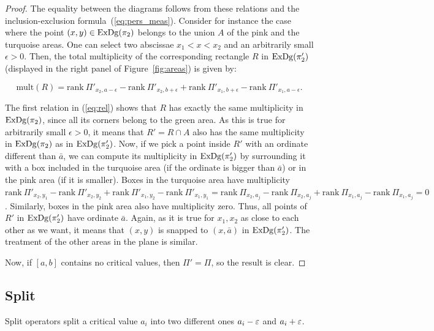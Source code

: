 \begin{proof}
The equality between the diagrams follows from these relations and the
inclusion-exclusion formula~(\ref{eq:pers_meas}).  Consider for
instance the case where the point $(x,y)\in\mathrm{ExDg}(\pi_2)$ belongs to the
union $A$ of the pink and the turquoise areas.  One can select two
abscissae $x_1<x<x_2$ and an arbitrarily small $\epsilon>0$. Then, the
total multiplicity of the corresponding rectangle $R$ in $\mathrm{ExDg}(\pi_2')$
(displayed in the right panel of Figure~\ref{fig:areas}) is given by:

\[ \text{mult}(R)=\text{rank}\ \Pi'_{x_2,a-\epsilon}-\text{rank}\ \Pi'_{x_2,b+\epsilon}+\text{rank}\ \Pi'_{x_1,b+\epsilon}-\text{rank}\ \Pi'_{x_1,a-\epsilon}. \]

The first relation in (\ref{eq:rel}) shows that $R$ has exactly the same multiplicity in $\mathrm{ExDg}(\pi_2)$, since all its corners belong to the green area.
As this is true for arbitrarily small $\epsilon>0$, it means that $R'=R\cap A$  also has the same multiplicity in $\mathrm{ExDg}(\pi_2)$ as in $\mathrm{ExDg}(\pi'_2)$.
Now, if we pick a point inside $R'$ with an ordinate different than $\bar{a}$, we can compute its multiplicity in $\mathrm{ExDg}(\pi'_2)$ 
by surrounding it with a box included in the turquoise area (if the ordinate is bigger than $\bar{a}$) or in the pink area (if it is smaller). 
Boxes in the turquoise area have multiplicity 
$\text{rank}\ \Pi'_{x_2,y_1}-\text{rank}\ \Pi'_{x_2,y_2}+\text{rank}\ \Pi'_{x_1,y_2}-\text{rank}\ \Pi'_{x_1,y_1}
=\text{rank}\ \Pi_{x_2,a_j}-\text{rank}\ \Pi_{x_2,a_j}+\text{rank}\ \Pi_{x_1,a_j}-\text{rank}\ \Pi_{x_1,a_j}=0$. 
Similarly, boxes in the pink area also have  multiplicity zero. Thus, all points of $R'$ in $\mathrm{ExDg}(\pi'_2)$ have 
ordinate $\bar{a}$. Again, as it is true for $x_1,x_2$ as close to each other as we want, it means that $(x,y)$ 
is snapped to $(x,\bar{a})$ in $\mathrm{ExDg}(\pi'_2)$. The treatment of the other areas in the plane is similar.

Now, if $[a,b]$ contains no critical values, then $\Pi'=\Pi$, so the result is clear.
\end{proof}



\subsection*{Split}
\label{sec:split}

Split operators split a critical value $a_i$ into two different ones $a_i-\varepsilon$ and $a_i+\varepsilon$. 

